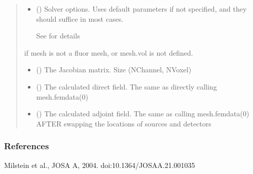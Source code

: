 \documentclass[letterpaper,10pt,english]{sphinxmanual}
\begin{document}
\begin{fulllineitems}
\begin{quote}
\begin{description}
\begin{itemize}
\item {} 
\sphinxAtStartPar
{} ({\hyperref[\detokenize{_autosummary/nirfasterff.utils.SolverOptions:nirfasterff.utils.SolverOptions}]{}}\sphinxstyleliteralemphasis{\sphinxupquote{, }}) \textendash{} 
\sphinxAtStartPar
Solver options. Uses default parameters if not specified, and they should suffice in most cases.

\sphinxAtStartPar
See {\hyperref[\detokenize{_autosummary/nirfasterff.utils.SolverOptions:nirfasterff.utils.SolverOptions}]{}} for details


\end{itemize}

\sphinxAtStartPar
{} \textendash{} if mesh is not a fluor mesh, or mesh.vol is not defined.

\sphinxAtStartPar
\begin{itemize}
\item {} 
\sphinxAtStartPar
{} () \textendash{} The Jacobian matrix. Size (NChannel, NVoxel)

\item {} 
\sphinxAtStartPar
{} () \textendash{} The calculated direct field. The same as directly calling mesh.femdata(0)

\item {} 
\sphinxAtStartPar
{} () \textendash{} The calculated adjoint field. The same as calling mesh.femdata(0) AFTER swapping the locations of sources and detectors

\end{itemize}


\end{description}\end{quote}
\subsubsection*{References}

\sphinxAtStartPar
Milstein et al., JOSA A, 2004. doi:10.1364/JOSAA.21.001035

\end{fulllineitems}
\end{document}
